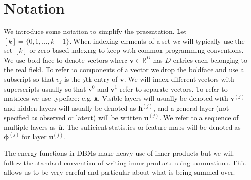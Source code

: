 \documentclass{article} %
\begin{document}


\section{Notation}

We introduce some notation to simplify the presentation. Let
$[k]=\{0,1,\ldots,k-1\}$.  When indexing elements of a set we will
typically use the set $[k]$ or zero-based indexing to keep with common
programming conventions.  We use bold-face to denote vectors where
$\mathbf{v}\in\mathbb{R}^D$ has $D$ entries each belonging to the real
field.  To refer to components of a vector we drop the boldface and
use a subscript so that $v_j$ is the $j$th entry of $\mathbf{v}$.  We
will index different vectors with superscripts usually so that
$\mathbf{v}^0$ and $\mathbf{v}^1$ refer to separate vectors. To refer
to matrices we use typeface: e.g. $\mathtt{A}$. Visible layers will
usually be denoted with $\mathbf{v}^{(j)}$ and hidden layers will
usually be denoted as $\mathbf{h}^{(j)}$, and a general layer (not
specified as observed or latent) will be written $\mathbf{u}^{(j)}$.
We refer to a sequence of multiple layers as $\overline{\mathbf{u}}$.
The sufficient statistics or feature maps will be denoted as $\boldsymbol{\phi}^{(j)}$
for layer $\mathbf{u}^{(j)}$.


The energy functions in DBMs make heavy use of inner products but we
will follow the standard convention of writing inner products using
summations.  This allows us to be very careful and particular about
what is being summed over.
\end{document}
